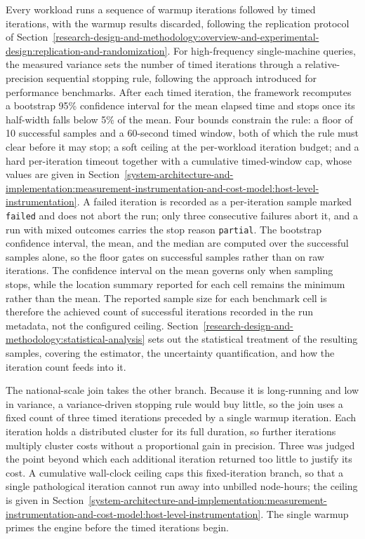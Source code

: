Every workload runs a sequence of warmup iterations followed by timed iterations, with the warmup results discarded, following the replication protocol of Section~\ref{research-design-and-methodology:overview-and-experimental-design:replication-and-randomization}. For high-frequency single-machine queries, the measured variance sets the number of timed iterations through a relative-precision sequential stopping rule, following the approach \textcite{georges2007_statistically_rigorous_java_performance} introduced for performance benchmarks. After each timed iteration, the framework recomputes a bootstrap \num{95}\% confidence interval for the mean elapsed time \parencite{laaber2019_software_microbenchmarking_cloud} and stops once its half-width falls below \num{5}\% of the mean. Four bounds constrain the rule: a floor of \num{10} successful samples and a \num{60}-second timed window, both of which the rule must clear before it may stop; a soft ceiling at the per-workload iteration budget; and a hard per-iteration timeout together with a cumulative timed-window cap, whose values are given in Section~\ref{system-architecture-and-implementation:measurement-instrumentation-and-cost-model:host-level-instrumentation}. A failed iteration is recorded as a per-iteration sample marked \texttt{failed} and does not abort the run; only three consecutive failures abort it, and a run with mixed outcomes carries the stop reason \texttt{partial}. The bootstrap confidence interval, the mean, and the median are computed over the successful samples alone, so the floor gates on successful samples rather than on raw iterations. The confidence interval on the mean governs only when sampling stops, while the location summary reported for each cell remains the minimum rather than the mean. The reported sample size for each benchmark cell is therefore the achieved count of successful iterations recorded in the run metadata, not the configured ceiling. Section~\ref{research-design-and-methodology:statistical-analysis} sets out the statistical treatment of the resulting samples, covering the estimator, the uncertainty quantification, and how the iteration count feeds into it.

The national-scale join takes the other branch. Because it is long-running and low in variance, a variance-driven stopping rule would buy little, so the join uses a fixed count of three timed iterations preceded by a single warmup iteration. Each iteration holds a distributed cluster for its full duration, so further iterations multiply cluster costs without a proportional gain in precision. Three was judged the point beyond which each additional iteration returned too little to justify its cost. A cumulative wall-clock ceiling caps this fixed-iteration branch, so that a single pathological iteration cannot run away into unbilled node-hours; the ceiling is given in Section~\ref{system-architecture-and-implementation:measurement-instrumentation-and-cost-model:host-level-instrumentation}. The single warmup primes the engine before the timed iterations begin.